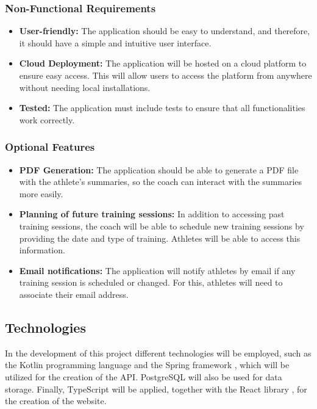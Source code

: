 \documentclass[a4paper,twoside,11pt]{article}
\begin{document}
\subsubsection{Non-Functional Requirements}
\begin{itemize}
\item \textbf{User-friendly:} The application should be easy to understand, and therefore, it should have a simple and intuitive user interface.
\item \textbf{Cloud Deployment:} The application will be hosted on a cloud platform to ensure easy access. This will allow users to access the platform from anywhere without needing local installations.
\item \textbf{Tested:} The application must include tests to ensure that all functionalities work correctly.
\end{itemize}

\subsubsection{Optional Features}
\begin{itemize}
\item \textbf{PDF Generation:} The application should be able to generate a PDF file with the athlete's summaries, so the coach can interact with the summaries more easily.
\item \textbf{Planning of future training sessions:} In addition to accessing past training sessions, the coach will be able to schedule new training sessions by providing the date and type of training. Athletes will be able to access this information.
\item \textbf{Email notifications:} The application will notify athletes by email if any training session is scheduled or changed. For this, athletes will need to associate their email address.
\end{itemize}

\subsection{Technologies}
In the development of this project different technologies will be employed, such as the Kotlin programming language \cite{kotlin} and the Spring framework \cite{spring}, which will be utilized for the creation of the API. PostgreSQL \cite{postgresql} will also be used for data storage. Finally, TypeScript \cite{typescript} will be applied, together with the React library \cite{react}, for the creation of the website.
\end{document}
